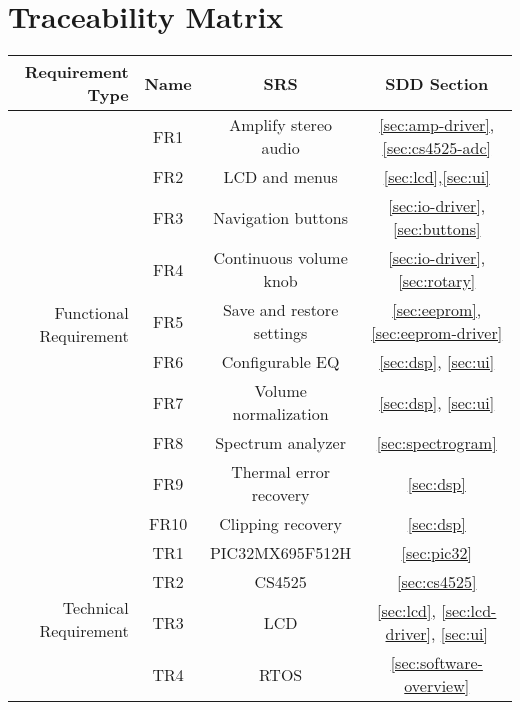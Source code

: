 \section{Traceability Matrix}
\begin{center}
\begin{tabular}{| r | c | c | c |}
\hline
\textbf{Requirement Type} & \textbf{Name} &  \textbf{SRS} & \textbf{SDD Section} \\
\hline
\multirow{10}{*}{Functional Requirement} & FR1 & Amplify stereo audio & \ref{sec:amp-driver}, \ref{sec:cs4525-adc} \\
 & FR2 & LCD and menus & \ref{sec:lcd},\ref{sec:ui} \\
 & FR3 & Navigation buttons & \ref{sec:io-driver}, \ref{sec:buttons} \\
 & FR4 & Continuous volume knob & \ref{sec:io-driver}, \ref{sec:rotary} \\
 & FR5 & Save and restore settings & \ref{sec:eeprom}, \ref{sec:eeprom-driver} \\
 & FR6 & Configurable EQ & \ref{sec:dsp}, \ref{sec:ui} \\
 & FR7 & Volume normalization & \ref{sec:dsp}, \ref{sec:ui}\\
 & FR8 & Spectrum analyzer & \ref{sec:spectrogram} \\
 & FR9 & Thermal error recovery & \ref{sec:dsp}\\
 & FR10 & Clipping recovery & \ref{sec:dsp} \\
\hline
\multirow{4}{*}{Technical Requirement} & TR1 & PIC32MX695F512H & \ref{sec:pic32} \\
 & TR2 & CS4525 & \ref{sec:cs4525} \\
 & TR3 & LCD & \ref{sec:lcd}, \ref{sec:lcd-driver}, \ref{sec:ui} \\
 & TR4 & RTOS & \ref{sec:software-overview}\\
\hline
\end{tabular}
\end{center}

